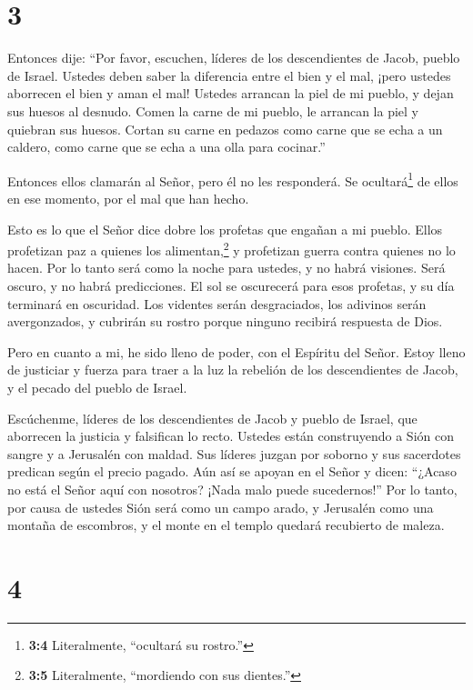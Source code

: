 \hypertarget{section-2}{%
\section{3}\label{section-2}}

 Entonces dije: ``Por favor, escuchen, líderes de los
descendientes de Jacob, pueblo de Israel. Ustedes deben saber la
diferencia entre el bien y el mal,  ¡pero ustedes aborrecen
el bien y aman el mal! Ustedes arrancan la piel de mi pueblo, y dejan
sus huesos al desnudo.  Comen la carne de mi pueblo, le
arrancan la piel y quiebran sus huesos. Cortan su carne en pedazos como
carne que se echa a un caldero, como carne que se echa a una olla para
cocinar.''

 Entonces ellos clamarán al Señor, pero él no les
responderá. Se ocultará\footnote{\textbf{3:4} Literalmente, ``ocultará
  su rostro.''} de ellos en ese momento, por el mal que han hecho.

 Esto es lo que el Señor dice dobre los profetas que engañan
a mi pueblo. Ellos profetizan paz a quienes los alimentan,\footnote{\textbf{3:5}
  Literalmente, ``mordiendo con sus dientes.''} y profetizan guerra
contra quienes no lo hacen.  Por lo tanto será como la noche
para ustedes, y no habrá visiones. Será oscuro, y no habrá predicciones.
El sol se oscurecerá para esos profetas, y su día terminará en
oscuridad.  Los videntes serán desgraciados, los adivinos
serán avergonzados, y cubrirán su rostro porque ninguno recibirá
respuesta de Dios.

 Pero en cuanto a mi, he sido lleno de poder, con el
Espíritu del Señor. Estoy lleno de justiciar y fuerza para traer a la
luz la rebelión de los descendientes de Jacob, y el pecado del pueblo de
Israel.

 Escúchenme, líderes de los descendientes de Jacob y pueblo
de Israel, que aborrecen la justicia y falsifican lo recto.
 Ustedes están construyendo a Sión con sangre y a Jerusalén
con maldad.  Sus líderes juzgan por soborno y sus
sacerdotes predican según el precio pagado. Aún así se apoyan en el
Señor y dicen: ``¿Acaso no está el Señor aquí con nosotros? ¡Nada malo
puede sucedernos!''  Por lo tanto, por causa de ustedes
Sión será como un campo arado, y Jerusalén como una montaña de
escombros, y el monte en el templo quedará recubierto de maleza.

\hypertarget{section-3}{%
\section{4}\label{section-3}}

